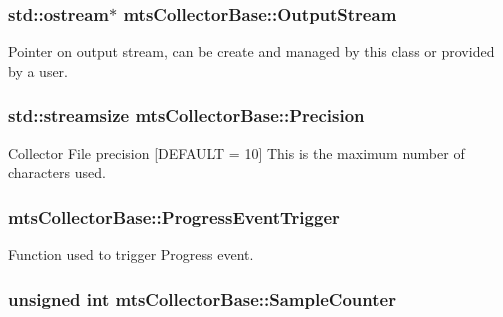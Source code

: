 \hypertarget{classmts_collector_base_a4901f9bf045081f0d79ada98fb06c57b}{
\subsubsection[{Output\-Stream}]{\setlength{\rightskip}{0pt plus 5cm}std\-::ostream$\ast$ mts\-Collector\-Base\-::\-Output\-Stream\hspace{0.3cm}{\ttfamily [protected]}}}\label{classmts_collector_base_a4901f9bf045081f0d79ada98fb06c57b}
Pointer on output stream, can be create and managed by this class or provided by a user. \hypertarget{classmts_collector_base_a86d6b8c24e20957932325ce8183d0abf}{
\subsubsection[{Precision}]{\setlength{\rightskip}{0pt plus 5cm}std\-::streamsize mts\-Collector\-Base\-::\-Precision\hspace{0.3cm}{\ttfamily [protected]}}}\label{classmts_collector_base_a86d6b8c24e20957932325ce8183d0abf}
Collector File precision \mbox{[}D\-E\-F\-A\-U\-L\-T = 10\mbox{]} This is the maximum number of characters used. \hypertarget{classmts_collector_base_a038835b577383fbc4b437ff60563b55b}{
\subsubsection[{Progress\-Event\-Trigger}]{ mts\-Collector\-Base\-::\-Progress\-Event\-Trigger}}\label{classmts_collector_base_a038835b577383fbc4b437ff60563b55b}
Function used to trigger Progress event. \hypertarget{classmts_collector_base_a08c8c1889a10cba359bc799bbf5d218b}{
\subsubsection[{Sample\-Counter}]{\setlength{\rightskip}{0pt plus 5cm}unsigned int mts\-Collector\-Base\-::\-Sample\-Counter\hspace{0.3cm}{\ttfamily [protected]}}}\label{classmts_collector_base_a08c8c1889a10cba359bc799bbf5d218b}
